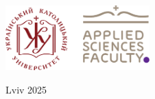 \documentclass[
    11pt, %
    oneside, %
    ukrainian,
    english, %
    singlespacing, %
    headsepline, %
]{BachelorMasterThesis} %
\begin{document}
\begin{titlepage}
\begin{center}
\vfill
\includegraphics[height=2.5cm]{UCU_APPS_logo} %

\vfill
{\large Lviv 2025}\\[4cm] %
 
\vfill
\end{center}
\end{titlepage}



 
 
\end{document}
